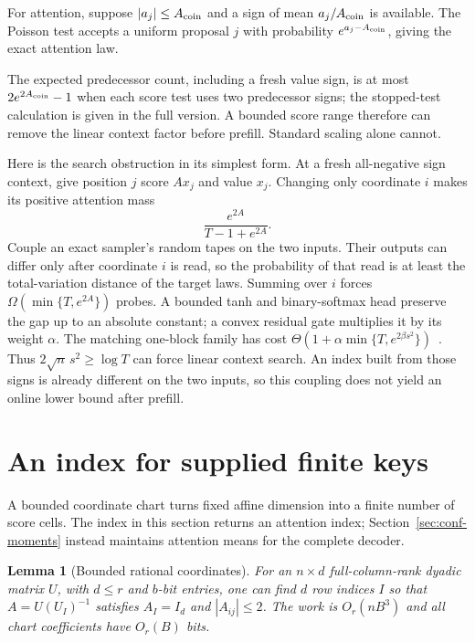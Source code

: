 \documentclass[11pt]{article}
\newtheorem{lemma}[theorem]{Lemma}
\theoremstyle{definition}\newtheorem{definition}[theorem]{Definition}
\theoremstyle{remark}\newtheorem{remark}[theorem]{Remark}
\numberwithin{equation}{section}
\begin{document}
For attention, suppose $|a_j|\le A_{\rm coin}$ and a sign of mean
$a_j/A_{\rm coin}$ is available. The Poisson test accepts a uniform
proposal $j$ with probability $e^{a_j-A_{\rm coin}}$, giving the
exact attention law.

The expected predecessor count, including
a fresh value sign, is at most $2e^{2A_{\rm coin}}-1$ when each score
test uses two predecessor signs; the stopped-test calculation is given
in the full version. A bounded score range therefore can remove the
linear context factor before prefill. Standard scaling alone cannot.

Here is the search obstruction in its simplest form. At a fresh
all-negative sign context, give position $j$ score $Ax_j$ and value
$x_j$. Changing only coordinate $i$ makes its positive attention mass
\[
 \frac{e^{2A}}{T-1+e^{2A}}.
\]
Couple an exact sampler's random tapes on the two inputs. Their outputs
can differ only after coordinate $i$ is read, so the probability of that
read is at least the total-variation distance of the target laws.
Summing over $i$ forces $\Omega(\min\{T,e^{2A}\})$ probes. A bounded
tanh and binary-softmax head preserve the gap up to an absolute constant;
a convex residual gate multiplies it by its weight $\alpha$.
The matching one-block family has cost
$\Theta(1+\alpha\min\{T,e^{2\beta s^2}\})$~\cite{mausbergfull2026}.
Thus $2\sqrt n\,s^2\ge\log T$ can force linear context search. An index
built from those signs is already different on the two inputs, so this
coupling does not yield an online lower bound after prefill.

\section{An index for supplied finite keys}
\label{sec:conf-grid}

A bounded coordinate chart turns fixed affine dimension into a finite
number of score cells. The index in this section returns an attention
index; Section~\ref{sec:conf-moments} instead maintains attention means
for the complete decoder.

\begin{lemma}[Bounded rational coordinates]
\label{lem:conf-chart}
For an $n\times d$ full-column-rank dyadic matrix $U$, with $d\le r$
and $b$-bit entries, one can find $d$ row indices $I$ so that
$A=U(U_I)^{-1}$ satisfies $A_I=I_d$ and $|A_{ij}|\le2$.
The work is $O_r(nB^3)$ and all chart coefficients have $O_r(B)$ bits.
\end{lemma}
\end{document}
